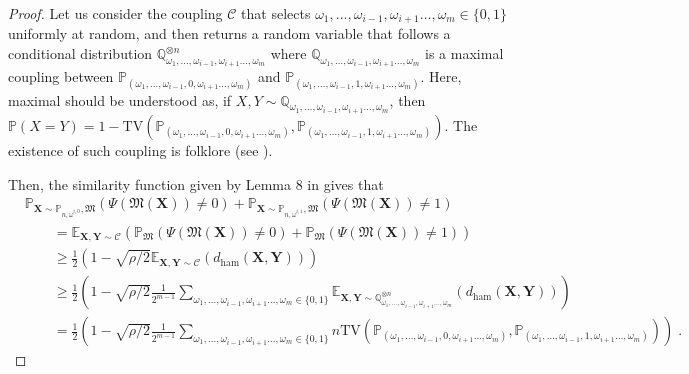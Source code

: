 \documentclass[10pt]{article} %
\newcommand{\Prob}[0]{\mathbb{P}}
\newcommand{\E}[0]{\mathbb{E}}
\newcommand\mech[1]{\mathfrak{#1}}
\newcommand\vect[1]{\mathbf{#1}}
\newcommand\tv[2]{\mathrm{TV}\left( {#1}, {#2} \right)}
\newcommand\ham[2]{d_\mathrm{ham}\left( {#1}, {#2} \right)}
\newcommand\p[1]{\left( {#1}\right)}
\begin{document}
\begin{proof}
    Let us consider the coupling $\mathcal{C}$ that selects $\omega_1, \dots, \omega_{i-1}, \omega_{i+1} \dots, \omega_{m} \in \{0, 1 \}$ uniformly at random, and then returns a random variable that follows a conditional distribution $\mathbb{Q}_{\omega_1, \dots, \omega_{i-1}, \omega_{i+1} \dots, \omega_{m}}^{\otimes n}$ where $\mathbb{Q}_{\omega_1, \dots, \omega_{i-1}, \omega_{i+1} \dots, \omega_{m}}$ is a maximal coupling between $\Prob_{(\omega_1, \dots, \omega_{i-1}, 0, \omega_{i+1} \dots, \omega_{m})}$ and $\Prob_{(\omega_1, \dots, \omega_{i-1}, 1, \omega_{i+1} \dots, \omega_{m})}$. Here, maximal should be understood as, if $X, Y \sim \mathbb{Q}_{\omega_1, \dots, \omega_{i-1}, \omega_{i+1} \dots, \omega_{m}}$, then $\Prob(X = Y) = 1 -\tv{\Prob_{(\omega_1, \dots, \omega_{i-1}, 0, \omega_{i+1} \dots, \omega_{m})}}{\Prob_{(\omega_1, \dots, \omega_{i-1}, 1, \omega_{i+1} \dots, \omega_{m})}}$. The existence of such coupling is folklore (see \cite{lindvall2002lectures}).

    Then, the similarity function given by Lemma 8 in \cite{lalanne2022statistical} gives that 
    \begin{equation*}
    \begin{aligned}
    &\Prob_{\mathbf{X} \sim \Prob_{n, \omega^{i, 0}}, \mech{M}} \p{ \Psi \p{\mech{M}(\vect{X})} \neq 0} + \Prob_{\mathbf{X} \sim \Prob_{n, \omega^{i, 1}}, \mech{M}} \p{ \Psi \p{\mech{M}(\vect{X})} \neq 1}
    \\ 
    &\quad\quad= \E_{\vect{X}, \vect{Y} \sim \mathcal{C} } \p{\Prob_{\mech{M}} \p{ \Psi \p{\mech{M}(\vect{X})} \neq 0} + \Prob_{\mech{M}} \p{ \Psi \p{\mech{M}(\vect{X})} \neq 1}} \\
    &\quad\quad\geq 
    \frac{1}{2} \p{1 - \sqrt{\rho/2} \E_{\vect{X}, \vect{Y} \sim \mathcal{C} }\p{\ham{\vect{X}}{\vect{Y}}}} \\
    &\quad\quad\geq 
    \frac{1}{2} \p{1 - \sqrt{\rho/2} \frac{1}{2^{m-1}}\sum_{\omega_1, \dots, \omega_{i-1}, \omega_{i+1} \dots, \omega_{m} \in \{0, 1 \}} \E_{\vect{X}, \vect{Y} \sim \mathbb{Q}_{\omega_1, \dots, \omega_{i-1}, \omega_{i+1} \dots, \omega_{m}}^{\otimes n}}\p{\ham{\vect{X}}{\vect{Y}}}} \\
    &\quad\quad=
    \frac{1}{2} \p{1 - \sqrt{\rho/2} \frac{1}{2^{m-1}}\sum_{\omega_1, \dots, \omega_{i-1}, \omega_{i+1} \dots, \omega_{m} \in \{0, 1 \}} n \tv{\Prob_{(\omega_1, \dots, \omega_{i-1}, 0, \omega_{i+1} \dots, \omega_{m})}}{\Prob_{(\omega_1, \dots, \omega_{i-1}, 1, \omega_{i+1} \dots, \omega_{m})}}}\;.
    \end{aligned}
\end{equation*}
\end{proof}
\end{document}
